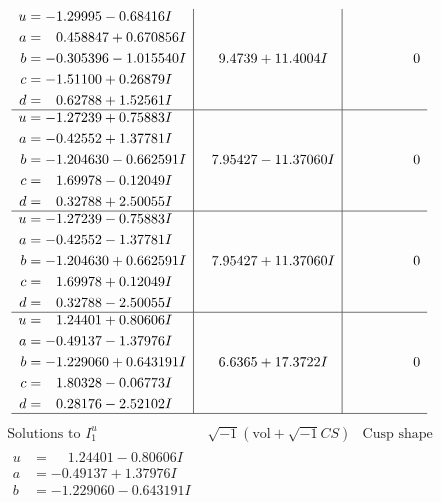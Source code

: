 \documentclass[1p]{elsarticle_modified}
\theoremstyle{definition}
\newcommand{\I}{\sqrt{-1}}
\begin{document}
$$\begin{array}{c|c|c}
\begin{aligned}
u &= -1.29995 - 0.68416 I \\
a &= \phantom{-}0.458847 + 0.670856 I \\
b &= -0.305396 - 1.015540 I \\
c &= -1.51100 + 0.26879 I \\
d &= \phantom{-}0.62788 + 1.52561 I\end{aligned}
 & \phantom{-}9.4739 + 11.4004 I & \phantom{-0.000000 } 0 \\ \hline\begin{aligned}
u &= -1.27239 + 0.75883 I \\
a &= -0.42552 + 1.37781 I \\
b &= -1.204630 - 0.662591 I \\
c &= \phantom{-}1.69978 - 0.12049 I \\
d &= \phantom{-}0.32788 + 2.50055 I\end{aligned}
 & \phantom{-}7.95427 - 11.37060 I & \phantom{-0.000000 } 0 \\ \hline\begin{aligned}
u &= -1.27239 - 0.75883 I \\
a &= -0.42552 - 1.37781 I \\
b &= -1.204630 + 0.662591 I \\
c &= \phantom{-}1.69978 + 0.12049 I \\
d &= \phantom{-}0.32788 - 2.50055 I\end{aligned}
 & \phantom{-}7.95427 + 11.37060 I & \phantom{-0.000000 } 0 \\ \hline\begin{aligned}
u &= \phantom{-}1.24401 + 0.80606 I \\
a &= -0.49137 - 1.37976 I \\
b &= -1.229060 + 0.643191 I \\
c &= \phantom{-}1.80328 - 0.06773 I \\
d &= \phantom{-}0.28176 - 2.52102 I\end{aligned}
 & \phantom{-}6.6365 + 17.3722 I & \phantom{-0.000000 } 0\\
 \hline 
 \end{array}$$\newpage$$\begin{array}{c|c|c}  
\text{Solutions to }I^u_{1}& \I (\text{vol} + \sqrt{-1}CS) & \text{Cusp shape}\\
 \hline 
\begin{aligned}
u &= \phantom{-}1.24401 - 0.80606 I \\
a &= -0.49137 + 1.37976 I \\
b &= -1.229060 - 0.643191 I \\

\end{aligned}
\end{array}$$
\end{document}

